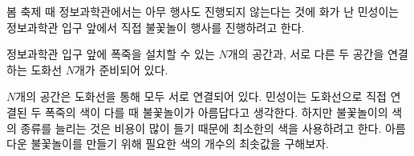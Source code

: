 봄 축제 때 정보과학관에서는 아무 행사도 진행되지 않는다는 것에 화가 난 민성이는 정보과학관 입구 앞에서 직접 불꽃놀이 행사를 진행하려고 한다.

정보과학관 입구 앞에 폭죽을 설치할 수 있는 $N$개의 공간과, 서로 다른 두 공간을 연결하는 도화선 $N$개가 준비되어 있다. 

$N$개의 공간은 도화선을 통해 모두 서로 연결되어 있다. 민성이는 도화선으로 직접 연결된 두 폭죽의 색이 다를 때 불꽃놀이가 아름답다고 생각한다. 하지만 불꽃놀이의 색의 종류를 늘리는 것은 비용이 많이 들기 때문에 최소한의 색을 사용하려고 한다. 아름다운 불꽃놀이를 만들기 위해 필요한 색의 개수의 최솟값을 구해보자.
